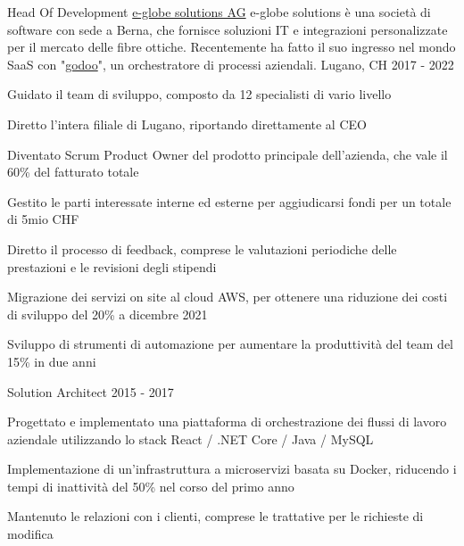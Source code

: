 \begin{cventries}
	\cventry
	{Head Of Development} %
	{\href{https://www.e-globe-solutions.com}{e-globe solutions AG}} %
  {e-globe solutions è una società di software con sede a Berna, che fornisce soluzioni IT e integrazioni personalizzate per il mercato delle fibre ottiche. Recentemente ha fatto il suo ingresso nel mondo SaaS con "\href{https://www.godoo.ch}{godoo}", un orchestratore di processi aziendali.} %
	{Lugano, CH} %
	{2017 - 2022} %
	{
		\begin{cvitems} %
			\item {Guidato il team di sviluppo, composto da 12 specialisti di vario livello}
			\item {Diretto l'intera filiale di Lugano, riportando direttamente al CEO}
			\item {Diventato Scrum Product Owner del prodotto principale dell'azienda, che vale il 60\% del fatturato totale}
			\item {Gestito le parti interessate interne ed esterne per aggiudicarsi fondi per un totale di 5mio CHF}
			\item {Diretto il processo di feedback, comprese le valutazioni periodiche delle prestazioni e le revisioni degli stipendi}
			\item {Migrazione dei servizi on site al cloud AWS, per ottenere una riduzione dei costi di sviluppo del 20\% a dicembre 2021}
			\item {Sviluppo di strumenti di automazione per aumentare la produttività del team del 15\% in due anni}
		\end{cvitems}
	}

  \cventry
    {Solution Architect} %
    {} %
    {} %
    {} %
    {2015 - 2017} %
    {
      \begin{cvitems} %
        \item {Progettato e implementato una piattaforma di orchestrazione dei flussi di lavoro aziendale utilizzando lo stack React / .NET Core / Java / MySQL}
        \item {Implementazione di un'infrastruttura a microservizi basata su Docker, riducendo i tempi di inattività del 50\% nel corso del primo anno}
        \item {Mantenuto le relazioni con i clienti, comprese le trattative per le richieste di modifica}
      \end{cvitems}
    }


\end{cventries}
